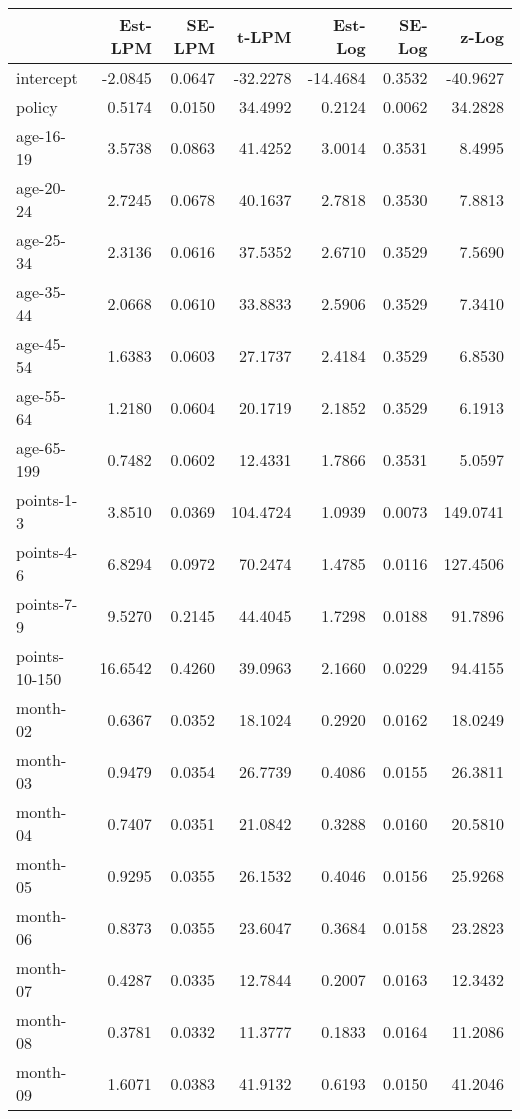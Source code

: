 \documentclass[10pt]{article}
\begin{document}
\begin{table}[ht]
\centering
\begin{tabular}{lrrrrrr}
  \hline
 & Est-LPM & SE-LPM & t-LPM & Est-Log & SE-Log & z-Log \\ 
  \hline
intercept & -2.0845 & 0.0647 & -32.2278 & -14.4684 & 0.3532 & -40.9627 \\ 
  policy & 0.5174 & 0.0150 & 34.4992 & 0.2124 & 0.0062 & 34.2828 \\ 
  age-16-19 & 3.5738 & 0.0863 & 41.4252 & 3.0014 & 0.3531 & 8.4995 \\ 
  age-20-24 & 2.7245 & 0.0678 & 40.1637 & 2.7818 & 0.3530 & 7.8813 \\ 
  age-25-34 & 2.3136 & 0.0616 & 37.5352 & 2.6710 & 0.3529 & 7.5690 \\ 
  age-35-44 & 2.0668 & 0.0610 & 33.8833 & 2.5906 & 0.3529 & 7.3410 \\ 
  age-45-54 & 1.6383 & 0.0603 & 27.1737 & 2.4184 & 0.3529 & 6.8530 \\ 
  age-55-64 & 1.2180 & 0.0604 & 20.1719 & 2.1852 & 0.3529 & 6.1913 \\ 
  age-65-199 & 0.7482 & 0.0602 & 12.4331 & 1.7866 & 0.3531 & 5.0597 \\ 
  points-1-3 & 3.8510 & 0.0369 & 104.4724 & 1.0939 & 0.0073 & 149.0741 \\ 
  points-4-6 & 6.8294 & 0.0972 & 70.2474 & 1.4785 & 0.0116 & 127.4506 \\ 
  points-7-9 & 9.5270 & 0.2145 & 44.4045 & 1.7298 & 0.0188 & 91.7896 \\ 
  points-10-150 & 16.6542 & 0.4260 & 39.0963 & 2.1660 & 0.0229 & 94.4155 \\ 
  month-02 & 0.6367 & 0.0352 & 18.1024 & 0.2920 & 0.0162 & 18.0249 \\ 
  month-03 & 0.9479 & 0.0354 & 26.7739 & 0.4086 & 0.0155 & 26.3811 \\ 
  month-04 & 0.7407 & 0.0351 & 21.0842 & 0.3288 & 0.0160 & 20.5810 \\ 
  month-05 & 0.9295 & 0.0355 & 26.1532 & 0.4046 & 0.0156 & 25.9268 \\ 
  month-06 & 0.8373 & 0.0355 & 23.6047 & 0.3684 & 0.0158 & 23.2823 \\ 
  month-07 & 0.4287 & 0.0335 & 12.7844 & 0.2007 & 0.0163 & 12.3432 \\ 
  month-08 & 0.3781 & 0.0332 & 11.3777 & 0.1833 & 0.0164 & 11.2086 \\ 
  month-09 & 1.6071 & 0.0383 & 41.9132 & 0.6193 & 0.0150 & 41.2046 \\ 

\end{tabular}
\end{table}
\end{document}

